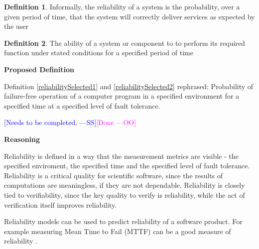 \documentclass[letterpaper,cleveref]{lipics-v2019}
\newcommand{\authornote}[3]{\textcolor{#1}{[#3 ---#2]}}
\newcommand{\authornote}[3]{}
\newcommand{\wss}[1]{\authornote{blue}{SS}{#1}} %
\newcommand{\oo}[1]{\authornote{magenta}{OO}{#1}} %
\theoremstyle{definition}
\newtheorem{defn}{Definition}
\begin{document}
\begin{defn}
	Informally, the reliability of a system is the probability, over a given
	period of time, that the system will correctly deliver services as expected by
	the user \citep{sommerville}
\end{defn}
	
\begin{defn}
  The ability of a system or component to to perform its required function under
  stated conditions for a specified period of time
  \citep{IEEEComputerDictionary1991}
\end{defn}


\noindent \textbf{Proposed Definition}

Definition \ref{reliabilitySelected1} and \ref{reliabilitySelected2} rephrased:
Probability of failure-free operation of a computer program in a specified
environment for a specified time at a specified level of fault tolerance.

\wss{Needs to be completed.}\oo{Done}

\noindent \textbf{Reasoning}

Reliability is defined in a way that the measurement metrics are visible - the
specified enviroment, the specified time and the specified level of fault
tolerance. Reliability is a critical quality for scientific software, since the
results of computations are meaningless, if they are not dependable.
Reliability is closely tied to verifiability, since the key quality to verify is
reliability, while the act of verification itself improves reliability.

Reliability models can be used to predict reliability of a software product. For
example measuring Mean Time to Fail (MTTF) can be a good measure of reliability
\citep{berander2005software}.
\end{document}
